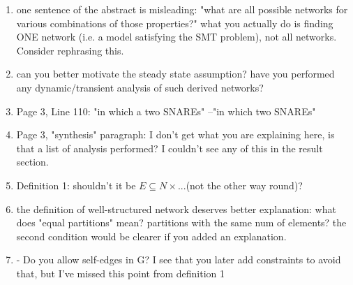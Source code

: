 \documentclass{llncs}
\begin{document}
\begin{enumerate}
\item one sentence of the abstract is misleading: "what are all possible networks for
various combinations of those properties?" what you actually do is finding ONE
network (i.e. a model satisfying the SMT problem), not all networks. Consider
rephrasing this.\newline
{}
{\color{red}{done.}}\\

\item can you better motivate the steady state assumption? have you performed any
dynamic/transient analysis of such derived networks? \newline
{\color{red}{Fixed ! refer updated draft.}}\\

\item Page 3, Line 110: "in which a two SNAREs" --"in which two SNAREs" \newline{\color{red}{Fixed!}}\\

\item  Page 3, "synthesis" paragraph: I don't get what you are explaining here, is that a list of analysis performed? I couldn't see any of this in the result section. \newline
{\color{red}{Fixed! See updated draft}}\\

\item Definition 1: shouldn't it be $E \subseteq N \times ... $(not the other way round)? \newline
{\color{red}{done.}}\\

\item the definition of well-structured network deserves better explanation: what does
"equal partitions" mean? partitions with the same num of elements? the second
condition would be clearer if you added an explanation.\newline
{\color{red}{done.}}\\

\item -  Do you allow self-edges in G? I see that you later add constraints to avoid that, but I've missed this point from definition 1\newline
{\color{red}{it was already written in the definition of well-structured}}\\


\end{enumerate}
\end{document}
